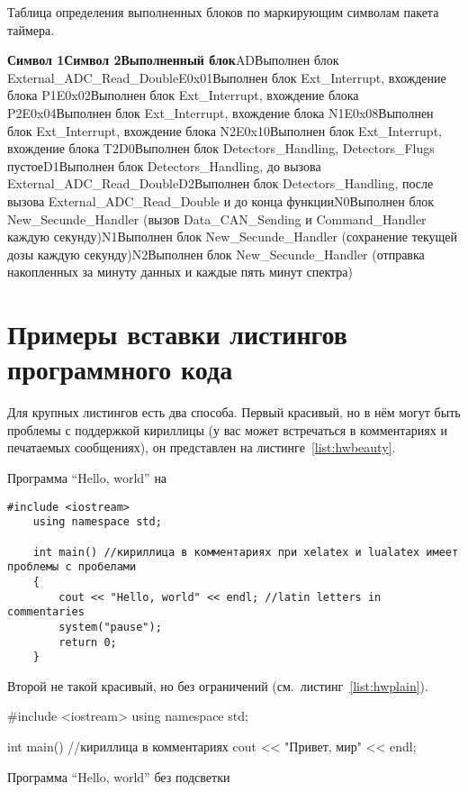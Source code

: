 Таблица определения выполненных блоков по маркирующим символам пакета таймера.


\textbf{Символ 1Символ 2Выполненный блок}ADВыполнен блок External\_ADC\_Read\_DoubleE0x01Выполнен блок Ext\_Interrupt, вхождение блока P1E0x02Выполнен блок Ext\_Interrupt, вхождение блока P2E0x04Выполнен блок Ext\_Interrupt, вхождение блока N1E0x08Выполнен блок Ext\_Interrupt, вхождение блока N2E0x10Выполнен блок Ext\_Interrupt, вхождение блока T2D0Выполнен блок Detectors\_Handling, Detectors\_Flugs пустоеD1Выполнен блок Detectors\_Handling, до вызова External\_ADC\_Read\_DoubleD2Выполнен блок Detectors\_Handling, после вызова External\_ADC\_Read\_Double и до конца функцииN0Выполнен блок New\_Secunde\_Handler (вызов Data\_CAN\_Sending и Command\_Handler каждую секунду)N1Выполнен блок New\_Secunde\_Handler (сохранение текущей дозы каждую секунду)N2Выполнен блок New\_Secunde\_Handler (отправка накопленных за минуту данных и каждые пять минут спектра)


\chapter{Примеры вставки листингов программного кода} \label{AppendixA}

Для крупных листингов есть два способа. Первый красивый, но в нём могут быть проблемы с поддержкой кириллицы (у вас может встречаться в комментариях и
печатаемых сообщениях), он представлен на листинге~\ref{list:hwbeauty}.
\begin{ListingEnv}[H]%
    \caption{Программа “Hello, world” на \protect\cpp}
    \label{list:hwbeauty}
    \begin{lstlisting}[language={[ISO]C++}]
	#include <iostream>
	using namespace std;

	int main() //кириллица в комментариях при xelatex и lualatex имеет проблемы с пробелами
	{
		cout << "Hello, world" << endl; //latin letters in commentaries
		system("pause");
		return 0;
	}
    \end{lstlisting}
\end{ListingEnv}%
Второй не такой красивый, но без ограничений (см.~листинг~\ref{list:hwplain}).
\begin{ListingEnv}[H]
    \begin{Verb}
        
        #include <iostream>
        using namespace std;
        
        int main() //кириллица в комментариях
        {
            cout << "Привет, мир" << endl;
        }
    \end{Verb}
    \caption{Программа “Hello, world” без подсветки}
    \label{list:hwplain}
\end{ListingEnv}

